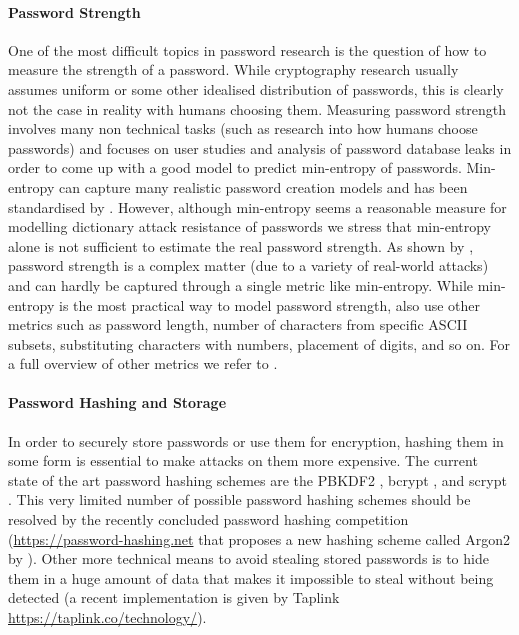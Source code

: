 \paragraph{Password Strength}
One of the most difficult topics in password research is the question of how to measure the strength of a password.
While cryptography research usually assumes uniform or some other idealised distribution of passwords, this is clearly not the case in reality with humans choosing them.
Measuring password strength involves many non technical tasks (such as research into how humans choose passwords) and focuses on user studies and analysis of password database leaks \cite{ShayKKLMBCC10,KomanduriSKMBCCE11,MazurekKVBCCKSU13} in order to come up with a good model to predict min-entropy of passwords.
Min-entropy can capture many realistic password creation models and has been standardised by \citet{nist800}.
However, although min-entropy seems a reasonable measure for modelling dictionary attack resistance of passwords we stress that min-entropy alone is not sufficient to estimate the real password strength. 
As shown by \citet{MazurekKVBCCKSU13}, password strength is a complex matter (due to a variety of real-world attacks) and can hardly be captured through a single metric like min-entropy.
While min-entropy is the most practical way to model password strength, \citet{MazurekKVBCCKSU13} also use other metrics such as password length, number of characters from specific \ac{ASCII} subsets, substituting characters with numbers, placement of digits, and so on.
For a full overview of other metrics we refer to \citet{MazurekKVBCCKSU13}.

\paragraph{Password Hashing and Storage}
In order to securely store passwords or use them for encryption, hashing them in some form is essential to make attacks on them more expensive.
The current state of the art password hashing schemes are the \ac{PBKDF2} \cite{rfc2898}, bcrypt \cite{ProvosM99}, and scrypt \cite{rfcScrypt}.
This very limited number of possible password hashing schemes should be resolved by the recently concluded password hashing competition (\url{https://password-hashing.net} that proposes a new hashing scheme called Argon2 by \citet{Biryukov15}).
Other more technical means to avoid stealing stored passwords is to hide them in a huge amount of data that makes it impossible to steal without being detected (a recent implementation is given by Taplink \url{https://taplink.co/technology/}).

